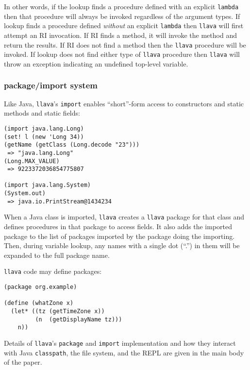 \documentclass{acm_proc_article-sp}
\begin{document}
In other words, if the lookup finds a procedure defined with an
explicit {\tt lambda} then that procedure will always be invoked
regardless of the argument types.  If lookup finds a procedure defined
\emph{without} an explicit {\tt lambda} then {\tt llava} will first
attempt an RI invocation.  If RI finds a method, it will invoke the
method and return the results.  If RI does not find a method then the
{\tt llava} procedure will be invoked.  If lookup does not find either
type of {\tt llava} procedure then {\tt llava} will throw an exception
indicating an undefined top-level variable.

\subsubsection{package/import system}

Like Java, {\tt llava}'s {\tt import} enables ``short''-form access to
constructors and static methods and static fields:

\small
\begin{verbatim}
(import java.lang.Long)
(set! l (new 'Long 34))
(getName (getClass (Long.decode "23")))
 => "java.lang.Long"
(Long.MAX_VALUE)
 => 9223372036854775807

(import java.lang.System)
(System.out)
 => java.io.PrintStream@1434234
\end{verbatim}
\normalsize

When a Java class is imported, {\tt llava} creates a {\tt llava}
package for that class and defines procedures in that package to
access fields.  It also adds the imported package to the list of
packages imported by the package doing the importing.  Then, during
variable lookup, any names with a single dot (``.'') in them will be
expanded to the full package name.


{\tt llava} code may define packages:

\small
\begin{verbatim}
(package org.example)

(define (whatZone x)
  (let* ((tz (getTimeZone x))
         (n  (getDisplayName tz)))
    n))
\end{verbatim}
\normalsize


Details of {\tt llava}'s {\tt package} and {\tt import} implementation
and how they interact with Java {\tt classpath}, the file system, and
the REPL are given in the main body of the paper.
\end{document}
